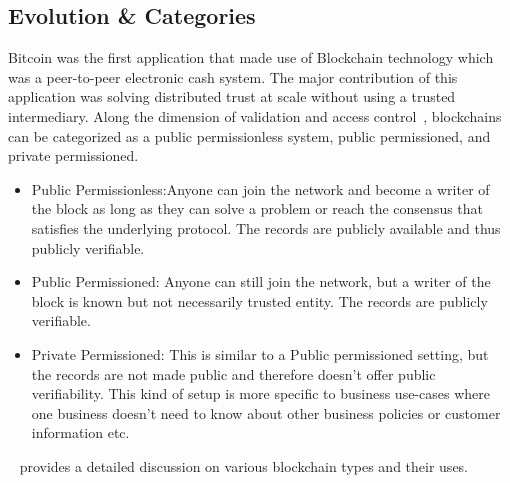 

\subsection{Evolution \& Categories}
Bitcoin was the first application that made use of Blockchain technology which
was a peer-to-peer electronic cash system. The major contribution of this
application was solving distributed trust at scale without using a trusted
intermediary. 
Along the dimension of validation and access control~\cite{voronchenko2017you},
blockchains can be categorized as a public permissionless system, public
permissioned, and private permissioned. 
\begin{itemize}
	\item Public Permissionless:Anyone can join the network and become a writer
		of the block as long as they can solve a problem or reach the consensus
		that satisfies the underlying protocol. The records are publicly
		available and thus publicly verifiable. 
	\item Public Permissioned: Anyone can still join the network, but a writer
		of the block is known but not necessarily trusted entity. The records
		are publicly verifiable. 
	\item Private Permissioned: This is similar to a Public permissioned
		setting, but the records are not made public and therefore doesn't
		offer public verifiability. This kind of setup is more specific to
		business use-cases where one business doesn't need to know about other
		business policies or customer information etc. 
\end{itemize}
~\cite{voronchenko2017you} provides a detailed discussion on various blockchain types and their
uses.


